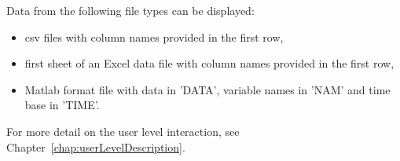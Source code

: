 Data from the following file types can be displayed:
\begin{itemize}
  \item \ac{csv} files with column names provided in the first row,
  \item first sheet of an Excel data file with column names provided in the first row,
  \item Matlab format file with data in 'DATA', variable names in 'NAM' and time base in 'TIME'.
\end{itemize}

For more detail on the user level interaction, see Chapter~\ref{chap:userLevelDescription}.
